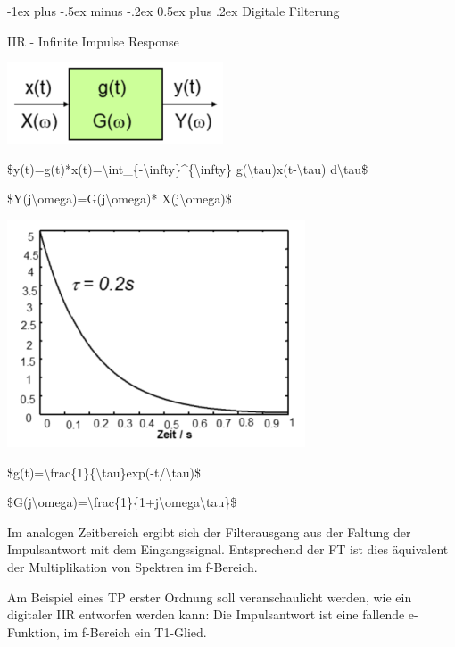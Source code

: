 \documentclass[a4paper]{article}
\makeatletter
\renewcommand{\section}{\@startsection{section}{1}{0mm}%
 {-1ex plus -.5ex minus -.2ex}%
 {0.5ex plus .2ex}%
 {\normalfont\large\bfseries}}
\makeatother
\begin{document}
\begin{multicols}{3}
  \section{Digitale Filterung}\label{digitale-filterung}

  IIR - Infinite Impulse Response

  \begin{itemize*}
    \item \includegraphics[width=.5\linewidth]{Assets/Biosignalverarbeitung-iir-1.png}
    \item \$y(t)=g(t)*x(t)=\textbackslash int\_\{-\textbackslash infty\}\^{}\{\textbackslash infty\} g(\textbackslash tau)x(t-\textbackslash tau) d\textbackslash tau\$
    \item \$Y(j\textbackslash omega)=G(j\textbackslash omega)* X(j\textbackslash omega)\$
    \item \includegraphics[width=.5\linewidth]{Assets/Biosignalverarbeitung-iir-2.png}
    \item \$g(t)=\textbackslash frac\{1\}\{\textbackslash tau\}exp(-t/\textbackslash tau)\$
    \item \$G(j\textbackslash omega)=\textbackslash frac\{1\}\{1+j\textbackslash omega\textbackslash tau\}\$
    \item Im analogen Zeitbereich ergibt sich der Filterausgang aus der Faltung der Impulsantwort mit dem Eingangssignal. Entsprechend der FT ist dies äquivalent der Multiplikation von Spektren im f-Bereich.
    \item Am Beispiel eines TP erster Ordnung soll veranschaulicht werden, wie ein digitaler IIR entworfen werden kann: Die Impulsantwort ist eine fallende e-Funktion, im f-Bereich ein T1-Glied.
  \end{itemize*}


\end{multicols}
\end{document}
